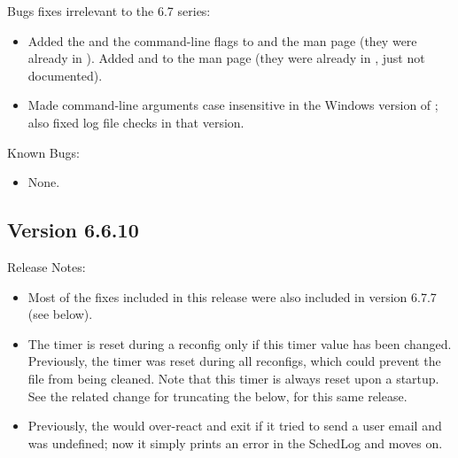 \noindent Bugs fixes irrelevant to the 6.7 series:

\begin{itemize}

\item Added the  and the 
command-line flags to  and the 
man page (they were already in ).
Added  and  to the 
man page (they were already in , just not
documented).

\item Made command-line arguments case insensitive in the Windows
version of ; also fixed log file checks in
that version.

\end{itemize}

\noindent Known Bugs:

\begin{itemize}

\item None.

\end{itemize}


\subsection{\label{sec:New-6-6-10}Version 6.6.10}

\noindent Release Notes:

\begin{itemize}

\item Most of the fixes included in this release were also included in
  version 6.7.7 (see below).

\item The  timer is reset during a 
 reconfig only if this timer value has been changed.
Previously, the timer was reset during all  reconfigs, which
could prevent the  file from being cleaned.  Note that
this timer is always reset upon a  startup.  See the
related change for truncating the  below, for this same
release.

\item Previously, the  would over-react and exit if it
tried to send a user email and  was undefined;
now it simply prints an error in the SchedLog and moves on.

\end{itemize}

